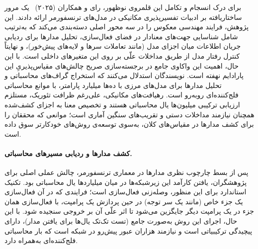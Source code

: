 برای درک انسجام و تکامل این قلمروی نوظهور، رای و همکاران (۲۰۲۵)~\cite{rai2025practicalreview} یک مرور ساختاریافته بر ادبیات تفسیرپذیری مکانیکی در مدل‌های ترنسفورمر ارائه دادند. این پژوهش، فرایند مهندسی معکوس را در سه محور اصلی دسته‌بندی می‌کند که به‌ترتیب شامل شناسایی جهت‌های معنادار در فضای فعال‌سازی، تحلیل مدارها برای ردیابی جریان اطلاعات میان اجزای مدل (مانند تعاملات سرها و لایه‌های پیش‌خور)، و نهایتاً کنترل رفتار مدل از طریق مداخلات علّی بر روی این متغیرهای داخلی است. با این حال، اهمیت این واکاوی جامع در برجسته‌سازی صریح چالش‌های مقیاس‌پذیریِ این پارادایم نهفته است. نویسندگان استدلال می‌کنند که استخراج گراف‌های محاسباتی و تحلیل مدارها برای مدل‌های مرزی با ده‌ها میلیارد پارامتر، با موانع محاسباتی فلج‌کننده‌ای روبه‌رو است. رهیافت‌های مکانیکی، علی‌رغم ظرافت تئوریک، مستلزم ارزیابی ترکیبی میلیون‌ها یال محاسباتی هستند و تخصیص معنا به اجزای کشف‌شده همچنان نیازمند مداخلات دستی و تقریب‌های سنگین آماری است؛ موانعی که محققان را برای کشف مدارها در مقیاس‌های کلان، به‌سوی توسعه‌ی روش‌های خودکارتر سوق داده است.

\paragraph{کشف مدارها و ردیابی مسیرهای محاسباتی.}

پس از بسط چارچوب نظری مدارها در معماری ترنسفورمر، چالش عملی اصلی برای پژوهشگران، یافتن کارآمد این زیرشبکه‌ها در میان میلیاردها یال محاسباتی بود. تکنیک استاندارد برای این منظور، وصله‌زنی فعال‌سازی است؛ فرایندی که در آن فعال‌سازی یک جزء خاص (مانند یک سر توجه) در حین پردازش یک پرامپت، با فعال‌سازی همان جزء در یک پرامپت دیگر جایگزین می‌شود تا اثر علّی آن بر خروجی سنجیده شود. با این حال، اجرای این روش به‌صورت جامع (تست تک‌تک یال‌ها برای یافتن مدار)، دارای پیچیدگی ترکیبیاتی است و نیازمند هزاران عبور پیش‌رو در شبکه است که بار محاسباتی فلج‌کننده‌ای به‌همراه دارد. 

